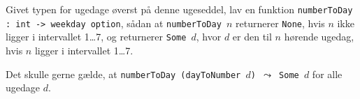Givet typen for ugedage øverst på denne ugeseddel, lav en
  funktion \texttt{numberToDay : int -> weekday option}, sådan at
  \texttt{numberToDay $n$} returnerer \texttt{None}, hvis $n$ ikke
  ligger i intervallet 1\ldots7, og returnerer \texttt{Some $d$}, hvor
  $d$ er den til $n$ hørende ugedag, hvis $n$ ligger i intervallet
  1\ldots7.

  Det skulle gerne gælde, at \texttt{numberToDay (dayToNumber $d$)
    $\leadsto$ Some $d$} for alle ugedage $d$.